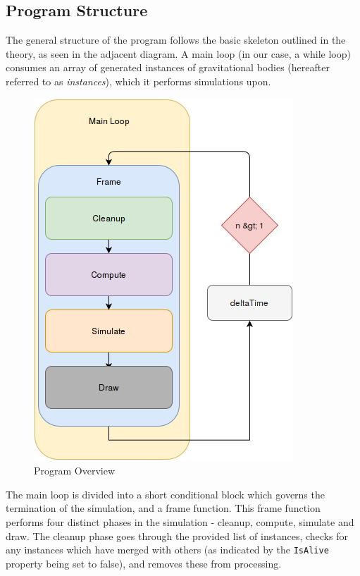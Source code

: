 \documentclass[11pt]{article}
\begin{document}
\subsection{Program Structure}
The general structure of the program follows the basic skeleton outlined in the theory, as seen in the adjacent diagram. 
A main loop (in our case, a while loop) consumes an array of generated instances of gravitational bodies (hereafter referred to as \emph{instances}), which it performs simulations upon.

\begin{figure}
	\begin{center}
    	\includegraphics[scale=0.40]{MainLoopDiagram}
    \end{center}
    \caption{Program Overview}
\end{figure}

The main loop is divided into a short conditional block which governs the termination of the simulation, and a frame function.
This frame function performs four distinct phases in the simulation - cleanup, compute, simulate and draw. The cleanup phase goes through the provided list of instances, checks for any instances which have merged with others (as indicated by the \verb|IsAlive| property being set to false), and removes these from processing.
\end{document}

